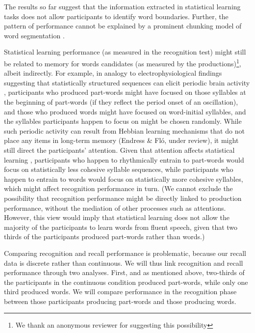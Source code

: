 \documentclass[
]{article}
\begin{document}
The results so far suggest that the information extracted in statistical
learning tasks does not allow participants to identify word boundaries.
Further, the pattern of performance cannot be explained by a prominent
chunking model of word segmentation \citep{Perruchet1998}.

Statistical learning performance (as measured in the recognition test)
might still be related to memory for words candidates (as measured by
the productions)\footnote{We thank an anonymous reviewer for suggesting
  this possibility}, albeit indirectly. For example, in analogy to
electrophysiological findings suggesting that statistically structured
sequences can elicit periodic brain activity
\citep[@Flo2022,@Kabdebon2015,@Moser2021]{Buiatti2009}, participants who
produced part-words might have focused on those syllables at the
beginning of part-words (if they reflect the period onset of an
oscillation), and those who produced words might have focused on
word-initial syllables, and the syllables participants happen to focus
on might be chosen randomly. While such periodic activity can result
from Hebbian learning mechanisms that do not place any items in
long-term memory (Endress \& Fló, under review), it might still direct
the participants' attention. Given that attention affects statistical
learning \citep[@Turk-Browne2005]{Toro2005a}, participants who happen to
rhythmically entrain to part-words would focus on statistically less
cohesive syllable sequences, while participants who happen to entrain to
words would focus on statistically more cohesive syllables, which might
affect recognition performance in turn. (We cannot exclude the
possibility that recognition performance might be directly linked to
production performance, without the mediation of other processes such as
attentions. However, this view would imply that statistical learning
does not allow the majority of the participants to learn words from
fluent speech, given that two thirds of the participants produced
part-words rather than words.)

Comparing recognition and recall performance is problematic, because our
recall data is discrete rather than continuous. We will thus link
recognition and recall performance through two analyses. First, and as
mentioned above, two-thirds of the participants in the continuous
condition produced part-words, while only one third produced words. We
will compare performance in the recognition phase between those
participants producing part-words and those producing words.
\end{document}

